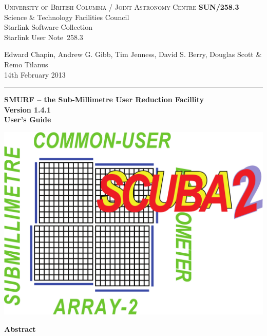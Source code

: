 \documentclass[twoside,11pt]{article}
\newcommand{\stardoccategory}  {Starlink User Note}
\newcommand{\stardocinitials}  {SUN}
\newcommand{\stardocnumber}    {258.3}
\newcommand{\stardocauthors}   {Edward Chapin, Andrew G. Gibb, Tim Jenness, David S. Berry, Douglas Scott \& Remo Tilanus}
\newcommand{\stardocdate}      {14th February 2013}
\newcommand{\stardoctitle}     {SMURF -- the Sub-Millimetre User Reduction Facillity}
\newcommand{\stardocversion}   {Version 1.4.1}
\newcommand{\stardocmanual}    {User's Guide}
\newcommand{\stardocname}{\stardocinitials /\stardocnumber}
\newenvironment{latexonly}{}{}
\renewcommand{\_}{\texttt{\symbol{95}}}
\begin{document}
\thispagestyle{empty}

\begin{latexonly}
   \textsc{University of British Columbia} / \textsc{Joint Astronomy Centre} \hfill \textbf{\stardocname}\\
   {\large Science \& Technology Facilities Council}\\
   {\large Starlink Software Collection\\}
   {\large \stardoccategory\ \stardocnumber}
   \begin{flushright}
   \stardocauthors\\
   \stardocdate
   \end{flushright}
   \vspace{-4mm}
   \rule{\textwidth}{0.5mm}
   \vspace{5mm}
   \begin{center}
   {\Huge\textbf{\stardoctitle \\ [2.5ex]}}
   {\LARGE\textbf{\stardocversion \\ [4ex]}}
   {\Huge\textbf{\stardocmanual}}
   \end{center}
   \vspace{5mm}

\begin{center}
\includegraphics[scale=0.3]{sun258_logo}
\end{center}

   \vspace{10mm}
   \begin{center}
      {\Large\textbf{Abstract}}
   \end{center}
\end{latexonly}
\end{document}
